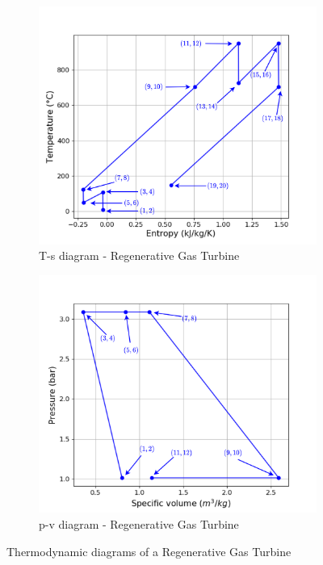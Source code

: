 \begin{figure}[h]
     \centering
     \begin{subfigure}[b]{0.4\textwidth}
         \centering
         \includegraphics[width=\textwidth]{Ts_IRHGT}
         \caption{T-s diagram - Regenerative Gas Turbine}
         \label{fig:C5_Ts_RGT}
     \end{subfigure}
     \begin{subfigure}[b]{0.4\textwidth}
         \centering
         \includegraphics[width=\textwidth]{pv_RGT}
         \caption{p-v diagram - Regenerative Gas Turbine}
         \label{fig:C5_pv_RGT}
     \end{subfigure}
        \caption{Thermodynamic diagrams of a Regenerative Gas Turbine}
        \label{fig:C5_thermo_diagram_RGT}
\end{figure}
